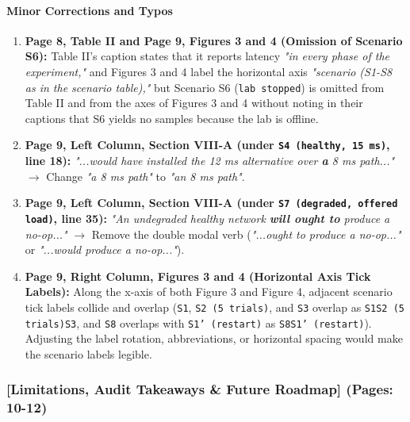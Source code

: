 \documentclass[11pt,a4paper]{article}
\begin{document}
\paragraph{Minor Corrections and Typos}
\begin{enumerate}[leftmargin=1.6em,itemsep=3pt]
\item \textbf{Page 8, Table II and Page 9, Figures 3 and 4 (Omission of Scenario S6):} Table II's caption states that it reports latency \emph{"in every phase of the experiment,"} and Figures 3 and 4 label the horizontal axis \emph{"scenario (S1-S8 as in the scenario table),"} but Scenario S6 (\texttt{lab stopped}) is omitted from Table II and from the axes of Figures 3 and 4 without noting in their captions that S6 yields no samples because the lab is offline.
\item \textbf{Page 9, Left Column, Section VIII-A (under \texttt{S4 (healthy, 15 ms)}, line 18):} \emph{"...would have installed the 12 ms alternative over \textbf{a} 8 ms path..."} $\rightarrow$ Change \emph{"a 8 ms path"} to \emph{"an 8 ms path"}.
\item \textbf{Page 9, Left Column, Section VIII-A (under \texttt{S7 (degraded, offered load)}, line 35):} \emph{"An undegraded healthy network \textbf{will ought to} produce a no-op..."} $\rightarrow$ Remove the double modal verb (\emph{"...ought to produce a no-op..."} or \emph{"...would produce a no-op..."}).
\item \textbf{Page 9, Right Column, Figures 3 and 4 (Horizontal Axis Tick Labels):} Along the x-axis of both Figure 3 and Figure 4, adjacent scenario tick labels collide and overlap (\texttt{S1}, \texttt{S2 (5 trials)}, and \texttt{S3} overlap as \texttt{S1S2 (5 trials)S3}, and \texttt{S8} overlaps with \texttt{S1' (restart)} as \texttt{S8S1' (restart)}). Adjusting the label rotation, abbreviations, or horizontal spacing would make the scenario labels legible.
\end{enumerate}
\subsubsection*{[Limitations, Audit Takeaways \& Future Roadmap] (Pages: 10-12)}
\end{document}

